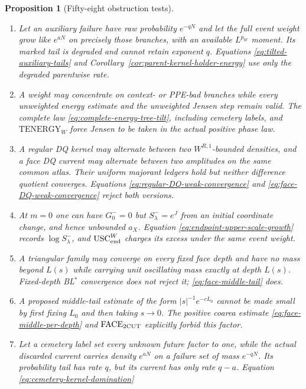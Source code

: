\documentclass[11pt]{article}
\newtheorem{proposition}[theorem]{Proposition}
\begin{document}
\begin{proposition}[Fifty-eight obstruction tests]
\begin{enumerate}[label=\textup{(T\arabic*)}]
      correlated-mark model.
\item Let an auxiliary failure have raw probability $e^{-qN}$ and let the
      full event weight grow like $e^{aN}$ on precisely those branches, with
      an available $L^{p_W}$ moment.  Its marked tail is degraded and cannot
      retain exponent $q$.  Equations
      \eqref{eq:tilted-auxiliary-tails} and
      Corollary~\ref{cor:parent-kernel-holder-energy} use only the degraded
      parentwise rate.
\item A weight may concentrate on context- or PPE-bad branches while every
      unweighted energy estimate and the unweighted Jensen step remain
      valid.  The complete law \eqref{eq:complete-energy-tree-tilt}, including
      cemetery labels, and $\mathrm{TENERGY}_{W}$ force Jensen to be taken in
      the actual positive phase law.
\item A regular DQ kernel may alternate between two
      $W^{R,1}$-bounded densities, and a face DQ current may alternate between
      two amplitudes on the same common atlas.  Their uniform majorant ledgers
      hold but neither difference quotient converges.  Equations
      \eqref{eq:regular-DQ-weak-convergence} and
      \eqref{eq:face-DQ-weak-convergence} reject both versions.
\item At $m=0$ one can have $G_0^-=0$ but
      $S_\lambda^-=e^J$ from an initial coordinate change, and hence
      unbounded $a_X$.  Equation \eqref{eq:endpoint-upper-scale-growth} records
      $\log S_\lambda^-$, and $\mathrm{USC}_{\rm end}^{W}$ charges its excess
      under the same event weight.
\item A triangular family may converge on every fixed face depth and have
      no mass beyond $L(s)$ while carrying unit oscillating mass exactly at
      depth $L(s)$.  Fixed-depth BL$^*$ convergence does not reject it;
      \eqref{eq:face-middle-tail} does.
\item A proposed middle-tail estimate of the form
      $|s|^{-1}e^{-cL_0}$ cannot be made small by first fixing $L_0$ and then
      taking $s\to0$.  The positive coarea estimate
      \eqref{eq:face-middle-per-depth} and
      $\mathrm{FACE}_{\rm 2CUT}$ explicitly forbid this factor.
\item Let a cemetery label set every unknown future factor to one, while the
      actual discarded current carries density $e^{aN}$ on a failure set of
      mass $e^{-qN}$.  Its probability tail has rate $q$, but its current
      has only rate $q-a$.  Equation \eqref{eq:cemetery-kernel-domination}

\end{enumerate}
\end{proposition}
\end{document}
